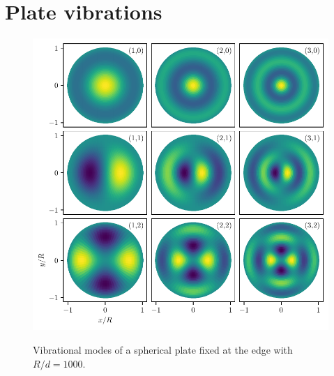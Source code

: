 \chapter{Plate vibrations}\label{cha:plate-vibrations}

\begin{figure}[!htbp]
  \centering
  \includegraphics[width=\textwidth]{./../figures/vibrational-modes.pdf}
  \label{fig:vibrational-modes}
  \caption{Vibrational modes of a spherical plate fixed at the edge with $R/d = 1000$.}
\end{figure}
